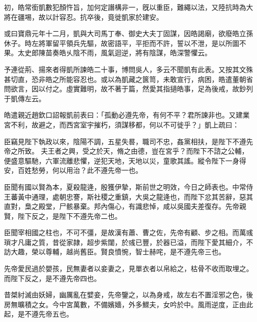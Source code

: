 \begin{pinyinscope}
 
 初，皓常銜凱數犯顏忤旨，加何定譖構非一，旣以重臣，難繩以法，又陸抗時為大將在疆埸，故以計容忍。抗卒後，竟徙凱家於建安。
 
 
 
 
 或曰寶鼎元年十二月，凱與大司馬丁奉、御史大夫丁固謀，因皓謁廟，欲廢皓立孫休子。時左將軍留平領兵先驅，故密語平，平拒而不許，誓以不泄，是以所圖不果。太史郎陳苗奏皓乆陰不雨，風氣迴逆，將有陰謀，皓深警懼云。
 
 
 
 
 
 
 予連從荊、揚來者得凱所諫皓二十事，博問吳人，多云不聞凱有此表。又按其文殊甚切直，恐非皓之所能容忍也。或以為凱藏之篋笥，未敢宣行，病困，皓遣董朝省問欲言，因以付之。虛實難明，故不著于篇，然愛其指擿皓事，足為後戒，故鈔列于凱傳左云。
 
 
 
 
 皓遣親近趙欽口詔報凱前表曰：「孤動必遵先帝，有何不平？君所諫非也。又建業宮不利，故避之，而西宮室宇摧朽，須謀移都，何以不可徙乎？」凱上疏曰：
 
 
臣竊見陛下執政以來，陰陽不調，五星失晷，職司不忠，姦黨相扶，是陛下不遵先帝之所致。
 夫王者之興，受之於天，脩之由德，豈在宮乎？而陛下不諮之公輔，便盛意驅馳，六軍流離悲懼，逆犯天地，天地以災，童歌其謠。縱令陛下一身得安，百姓愁勞，何以用治？此不遵先帝一也。
 
 
 
 
 臣聞有國以賢為本，夏殺龍逄，殷獲伊摯，斯前世之明效，今日之師表也。中常侍王蕃黃中通理，處朝忠謇，斯社稷之重鎮，大吳之龍逄也，而陛下忿其苦辭，惡其直對，梟之殿堂，尸骸暴棄。邦內傷心，有識悲悼，咸以吳國夫差復存。先帝親賢，陛下反之，是陛下不遵先帝二也。
 
 
 
 
 臣聞宰相國之柱也，不可不彊，是故漢有蕭、曹之佐，先帝有顧、步之相。而萬彧瑣才凡庸之質，昔從家隷，超步紫闥，於彧已豐，於器已溢，而陛下愛其細介，不訪大趣，榮以尊輔，越尚舊臣。賢良憤惋，智士赫咤，是不遵先帝三也。
 
 
 
 
 先帝愛民過於嬰孩，民無妻者以妾妻之，見單衣者以帛給之，枯骨不收而取埋之。而陛下反之，是不遵先帝四也。
 
 
 
 
 昔桀紂滅由妖婦，幽厲亂在嬖妾，先帝鑒之，以為身戒，故左右不置淫邪之色，後房無曠積之女。今中宮萬數，不備嬪嬙，外多鰥夫，女吟於中。風雨逆度，正由此起，是不遵先帝五也。
 

\end{pinyinscope}
